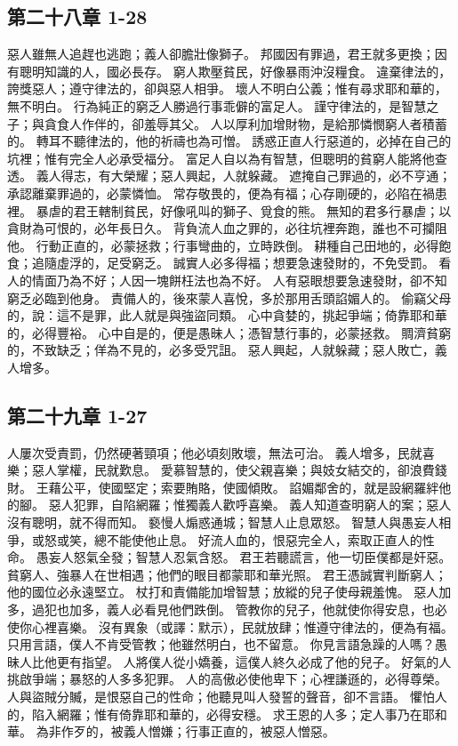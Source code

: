 \subsection{第二十八章 1-28}
惡人雖無人追趕也逃跑；義人卻膽壯像獅子。
邦國因有罪過，君王就多更換；因有聰明知識的人，國必長存。
窮人欺壓貧民，好像暴雨沖沒糧食。
違棄律法的，誇獎惡人；遵守律法的，卻與惡人相爭。
壞人不明白公義；惟有尋求耶和華的，無不明白。
行為純正的窮乏人勝過行事乖僻的富足人。
謹守律法的，是智慧之子；與貪食人作伴的，卻羞辱其父。
人以厚利加增財物，是給那憐憫窮人者積蓄的。
轉耳不聽律法的，他的祈禱也為可憎。
誘惑正直人行惡道的，必掉在自己的坑裡；惟有完全人必承受福分。
富足人自以為有智慧，但聰明的貧窮人能將他查透。
義人得志，有大榮耀；惡人興起，人就躲藏。
遮掩自己罪過的，必不亨通；承認離棄罪過的，必蒙憐恤。
常存敬畏的，便為有福；心存剛硬的，必陷在禍患裡。
暴虐的君王轄制貧民，好像吼叫的獅子、覓食的熊。
無知的君多行暴虐；以貪財為可恨的，必年長日久。
背負流人血之罪的，必往坑裡奔跑，誰也不可攔阻他。
行動正直的，必蒙拯救；行事彎曲的，立時跌倒。
耕種自己田地的，必得飽食；追隨虛浮的，足受窮乏。
誠實人必多得福；想要急速發財的，不免受罰。
看人的情面乃為不好；人因一塊餅枉法也為不好。
人有惡眼想要急速發財，卻不知窮乏必臨到他身。
責備人的，後來蒙人喜悅，多於那用舌頭諂媚人的。
偷竊父母的，說：這不是罪，此人就是與強盜同類。
心中貪婪的，挑起爭端；倚靠耶和華的，必得豐裕。
心中自是的，便是愚昧人；憑智慧行事的，必蒙拯救。
賙濟貧窮的，不致缺乏；佯為不見的，必多受咒詛。
惡人興起，人就躲藏；惡人敗亡，義人增多。

\subsection{第二十九章 1-27}
人屢次受責罰，仍然硬著頸項；他必頃刻敗壞，無法可治。
義人增多，民就喜樂；惡人掌權，民就歎息。
愛慕智慧的，使父親喜樂；與妓女結交的，卻浪費錢財。
王藉公平，使國堅定；索要賄賂，使國傾敗。
諂媚鄰舍的，就是設網羅絆他的腳。
惡人犯罪，自陷網羅；惟獨義人歡呼喜樂。
義人知道查明窮人的案；惡人沒有聰明，就不得而知。
褻慢人煽惑通城；智慧人止息眾怒。
智慧人與愚妄人相爭，或怒或笑，總不能使他止息。
好流人血的，恨惡完全人，索取正直人的性命。
愚妄人怒氣全發；智慧人忍氣含怒。
君王若聽謊言，他一切臣僕都是奸惡。
貧窮人、強暴人在世相遇；他們的眼目都蒙耶和華光照。
君王憑誠實判斷窮人；他的國位必永遠堅立。
杖打和責備能加增智慧；放縱的兒子使母親羞愧。
惡人加多，過犯也加多，義人必看見他們跌倒。
管教你的兒子，他就使你得安息，也必使你心裡喜樂。
沒有異象（或譯：默示），民就放肆；惟遵守律法的，便為有福。
只用言語，僕人不肯受管教；他雖然明白，也不留意。
你見言語急躁的人嗎？愚昧人比他更有指望。
人將僕人從小嬌養，這僕人終久必成了他的兒子。
好氣的人挑啟爭端；暴怒的人多多犯罪。
人的高傲必使他卑下；心裡謙遜的，必得尊榮。
人與盜賊分贓，是恨惡自己的性命；他聽見叫人發誓的聲音，卻不言語。
懼怕人的，陷入網羅；惟有倚靠耶和華的，必得安穩。
求王恩的人多；定人事乃在耶和華。
為非作歹的，被義人憎嫌；行事正直的，被惡人憎惡。


